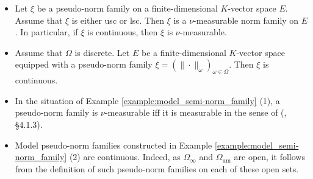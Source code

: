 \documentclass [11pt,reqno]{amsart}
\newcommand{\1}{\mathmybb{1}}
\def\um{\operatorname{um}}
\begin{document}
\begin{example}
\label{example:continuous_semi-norm_family_general}
\begin{itemize}
	\item[(1)] Let $\xi$ be a pseudo-norm family on a finite-dimensional $K$-vector space $E$. Assume that $\xi$ is either usc or lsc. Then $\xi$ is a $\nu$-measurable norm family on $E$. In particular, if $\xi$ is continuous, then $\xi$ is $\nu$-measurable.
	\item[(2)] Assume that $\Omega$ is discrete. Let $E$ be a finite-dimensional $K$-vector space equipped with a pseudo-norm family $\xi =(\|\cdot\|_\omega)_{\omega\in \Omega}$. Then $\xi$ is continuous.
	\item[(3)] In the situation of Example \ref{example:model_semi-norm_family} (1), a pseudo-norm family is $\nu$-measurable iff it is measurable in the sense of (\cite{ChenMori}, \S 4.1.3).
	\item[(4)] Model pseudo-norm families constructed in Example \ref{example:model_semi-norm_family} (2) are continuous. Indeed, as $\Omega_{\infty}$ and $\Omega_{\um}$ are open, it follows from the definition of such pseudo-norm families on each of these open sets.
\end{itemize}
\end{example}
\end{document}
